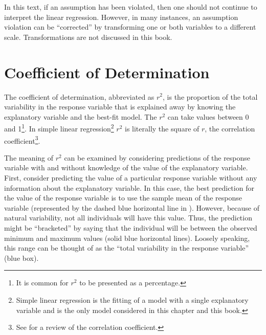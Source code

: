 \documentclass[10pt,openany]{book}\usepackage[]{graphicx}\usepackage[]{color}
\begin{document}
In this text, if an assumption has been violated, then one should not continue to interpret the linear regression.  However, in many instances, an assumption violation can be ``corrected'' by transforming one or both variables to a different scale.  Transformations are not discussed in this book.


\section{Coefficient of Determination}
The coefficient of determination, abbreviated as $r^{2}$, is the proportion of the total variability in the response variable that is explained away by knowing the explanatory variable and the best-fit model.  The $r^{2}$ can take values between 0 and 1\footnote{It is common for $r^{2}$ to be presented as a percentage.}.  In simple linear regression\footnote{Simple linear regression is the fitting of a model with a single explanatory variable and is the only model considered in this chapter and this book.} $r^{2}$ is literally the square of $r$, the correlation coefficient\footnote{See  for a review of the correlation coefficient.}.


\vspace{-12pt}

The meaning of $r^{2}$ can be examined by considering predictions of the response variable with and without knowledge of the value of the explanatory variable.  First, consider predicting the value of a particular response variable without any information about the explanatory variable.  In this case, the best prediction for the value of the response variable is to use the sample mean of the response variable (represented by the dashed blue horizontal line in ).  However, because of natural variability, not all individuals will have this value.  Thus, the prediction might be ``bracketed'' by saying that the individual will be between the observed minimum and maximum values (solid blue horizontal lines).  Loosely speaking, this range can be thought of as the ``total variability in the response variable'' (blue box).
\end{document}
